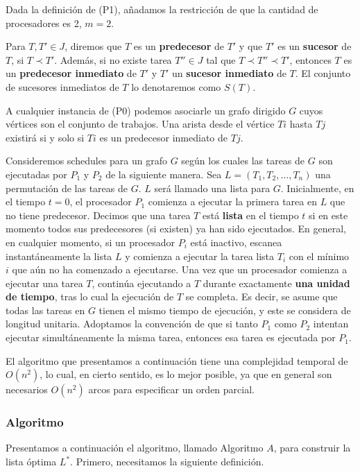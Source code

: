 \documentclass[14pt]{extarticle}
\begin{document}
Dada la definición de (P1), añadamos la restricción de que la cantidad de procesadores es 2, $m = 2$.

Para $T, T' \in J$, diremos que $T$ es un \textbf{predecesor} de $T'$ y que $T'$ es un \textbf{sucesor} de $T$, si $T \prec T'$. Además, si no existe tarea $T'' \in J$ tal que $T \prec T'' \prec T'$, entonces $T$ es un \textbf{predecesor inmediato} de $T'$ y $T'$ un \textbf{sucesor inmediato} de $T$. El conjunto de sucesores inmediatos de $T$ lo denotaremos como $S(T)$.

A cualquier instancia de (P0) podemos asociarle un grafo dirigido $G$ cuyos vértices son el conjunto de trabajos. Una arista desde el vértice $Ti$ hasta $Tj$ existirá si y solo si $Ti$ es un predecesor inmediato de $Tj$.

Consideremos schedules para un grafo $G$ según los cuales las tareas de $G$ son ejecutadas por $P_1$ y $P_2$ de la siguiente manera. Sea $L = (T_1, T_2, \dots, T_n)$ una permutación de las tareas de $G$. $L$ será llamado una lista para $G$. Inicialmente, en el tiempo $t = 0$, el procesador $P_1$ comienza a ejecutar la primera tarea en $L$ que no tiene predecesor. Decimos que una tarea $T$ está \textbf{lista} en el tiempo $t$ si en este momento todos sus predecesores (si existen) ya han sido ejecutados. En general, en cualquier momento, si un procesador $P_i$ está inactivo, escanea instantáneamente la lista $L$ y comienza a ejecutar la tarea lista $T_i$ con el mínimo $i$ que aún no ha comenzado a ejecutarse. Una vez que un procesador comienza a ejecutar una tarea $T$, continúa ejecutando a $T$ durante exactamente \textbf{una unidad de tiempo}, tras lo cual la ejecución de $T$ se completa. Es decir, se asume que todas las tareas en $G$ tienen el mismo tiempo de ejecución, y este se considera de longitud unitaria. Adoptamos la convención de que si tanto $P_1$ como $P_2$ intentan ejecutar simultáneamente la misma tarea, entonces esa tarea es ejecutada por $P_1$.

El algoritmo que presentamos a continuación tiene una complejidad temporal de $O(n^2)$, lo cual, en cierto sentido, es lo mejor posible, ya que en general son necesarios $O(n^2)$ arcos para especificar un orden parcial.

\subsubsection*{Algoritmo}

Presentamos a continuación el algoritmo, llamado Algoritmo $A$, para construir la lista óptima $L^*$. Primero, necesitamos la siguiente definición.
\end{document}
